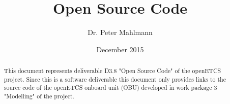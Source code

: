 \documentclass{template/openetcs_article}
\begin{document}
\frontmatter
{}







\title{Open Source Code}


\date{December 2015}










\author{Dr. Peter Mahlmann}







\begin{abstract}
  This document represents deliverable D3.8 "Open Source Code" of the openETCS project. Since this is a software deliverable this document only provides links to the source code of the openETCS onboard unit (OBU) developed in work package 3 "Modelling" of the project.
\end{abstract}

\maketitle
\end{document}
